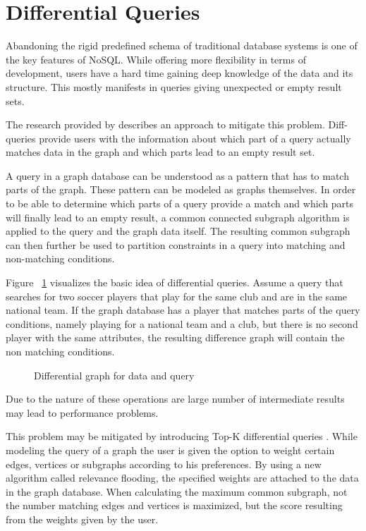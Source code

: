 \documentclass{sig-alternate}
\begin{document}
\section{Differential Queries}

Abandoning the rigid predefined schema of traditional database systems is one of the 
key features of NoSQL. While offering more flexibility in terms of development,
users have a hard time gaining deep knowledge of the data and its structure.
This mostly manifests in queries giving unexpected or empty result sets.

The research provided by \cite{vasilyeva2014graphmcs} describes an approach to mitigate this problem.
Diff-queries provide users with the information about which part of a query actually
matches data in the graph and which parts lead to an empty result set.

A query in a graph database can be understood as a pattern that has to match parts of the graph.
These pattern can be modeled as graphs themselves. 
In order to be able to determine which parts of a query provide a match
and which parts will finally lead to an empty result, a common connected subgraph algorithm is
applied to the query and the graph data itself.
The resulting common subgraph can then further be used to partition 
constraints in a query into matching and non-matching conditions.

Figure ~\ref{fig:diffquery} visualizes the basic idea of
differential queries. Assume a query that searches for two soccer 
players that play for the same club and are in the same national team.
If the graph database has a player that matches parts of the query conditions,
namely playing for a national team and a club, but there is no second player with the 
same attributes, the resulting difference graph will contain the non matching conditions.

\begin{figure}
\centering
{}
\caption{Differential graph for data and query}
\label{fig:diffquery}
\end{figure}


Due to the nature of these operations are large number of intermediate results 
may lead to performance problems.


This problem may be mitigated by introducing Top-K differential queries \cite{vasilyeva2014top}. 
While modeling the query of a graph the user is given the option to weight 
certain edges, vertices or subgraphs according to his preferences.
By using a new algorithm called relevance flooding, the specified weights are 
attached to the data in the graph database.
When calculating the maximum common subgraph, not the number matching edges and
vertices is maximized, but the score resulting from the weights given by the user.
\end{document}

